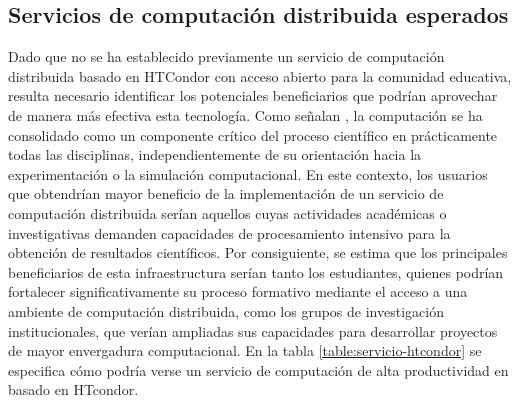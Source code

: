 \subsection{Servicios de computación distribuida esperados}
\noindent
Dado que no se ha establecido previamente un servicio de computación distribuida basado en HTCondor con acceso abierto para la comunidad educativa, resulta necesario identificar los potenciales beneficiarios que podrían aprovechar de manera más efectiva esta tecnología. Como señalan \cite{Wilson2016}, la computación se ha consolidado como un componente crítico del proceso científico en prácticamente todas las disciplinas, independientemente de su orientación hacia la experimentación o la simulación computacional. En este contexto, los usuarios que obtendrían mayor beneficio de la implementación de un servicio de computación distribuida serían aquellos cuyas actividades académicas o investigativas demanden capacidades de procesamiento intensivo para la obtención de resultados científicos. Por consiguiente, se estima que los principales beneficiarios de esta infraestructura serían tanto los estudiantes, quienes podrían fortalecer significativamente su proceso formativo mediante el acceso a una ambiente de computación distribuida, como los grupos de investigación institucionales, que verían ampliadas sus capacidades para desarrollar proyectos de mayor envergadura computacional. En la tabla \ref{table:servicio-htcondor} se especifica cómo podría verse un servicio de computación de alta productividad en  basado en HTcondor.

